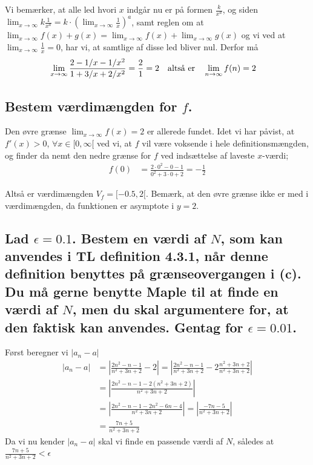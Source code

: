 \documentclass[11pt,a4paper]{article}
\newcommand{\modulus}[1]{\lvert#1\rvert}
\newcommand{\limit}[2]{\lim_{#1 \rightarrow #2}}
\begin{document}
Vi bemærker, at alle led hvori $x$ indgår nu er på formen $\frac{k}{x^a}$,
og siden $\limit{x}{\infty} k \frac{1}{x^a} = k \cdot \left( \limit{x}{\infty}
\frac{1}{x} \right)^a$, samt reglen om at $\limit{x}{\infty} f(x) + g(x) =
\limit{x}{\infty} f(x) + \limit{x}{\infty} g(x)$ og vi ved at
$\limit{x}{\infty} \frac{1}{x} = 0$, har vi, at samtlige af disse led bliver
nul. Derfor må
\begin{align}
    \limit{x}{\infty}
    \frac{2 - 1/x - 1/x^2}{1 + 3/x + 2/x^2} &= \frac{2}{1} = 2
    \quad
    \text{\textnormal altså er}
    \quad
    \limit{n}{\infty} f(n) = 2
\end{align}

\subsection{\mdseries Bestem værdimængden for $f$.}
Den øvre grænse $\limit{x}{\infty} f(x) = 2$ er allerede fundet. Idet vi har
påvist, at $f'(x) > 0$, $\forall x \in [0, \infty[$ ved vi, at $f$ vil være
voksende i hele definitionsmængden, og finder da nemt den nedre grænse for
$f$ ved indsættelse af laveste $x$-værdi;
\begin{align}
    f(0) &= \frac{2 \cdot 0^2 - 0 - 1}{0^2 + 3 \cdot 0 + 2}
          = -\frac{1}{2}
\end{align}

Altså er værdimængden $V_f = [-0.5,2[$. Bemærk, at den øvre grænse ikke er
med i værdimængden, da funktionen er asymptote i $y = 2$.

\subsection{\mdseries Lad $\epsilon = 0.1$. Bestem en værdi af $N$, som kan
    anvendes i TL definition 4.3.1, når denne definition benyttes på
    grænseovergangen i (c). Du må gerne benytte Maple til at finde en værdi
    af $N$, men du skal argumentere for, at den faktisk kan anvendes. Gentag
    for $\epsilon = 0.01$.}
Først beregner vi $\modulus{a_n - a}$
\begin{align}
    |a_n - a| &= \left| \frac{2n^2 - n - 1}{n^2 + 3n + 2} - 2 \right|
               = \left| \frac{2n^2 - n - 1}{n^2 + 3n + 2} - 2
                        \frac{n^2 + 3n + 2}{n^2 + 3n + 2} \right| \\
              &= \left| \frac{2n^2 - n - 1 - 2(n^2 + 3n + 2)}
                             {n^2 + 3n + 2} \right| \\
              &= \left| \frac{2n^2 - n - 1 - 2n^2 - 6n - 4}
                             {n^2 + 3n + 2} \right|
               = \left| \frac{-7n - 5}{n^2 + 3n + 2} \right| \\
              &= \frac{7n + 5}{n^2 + 3n + 2}
\end{align}
Da vi nu kender $\modulus{a_n - a}$ skal vi finde en passende værdi af $N$,
således at $\frac{7n + 5}{n^2 + 3n + 2} < \epsilon$
\end{document}
